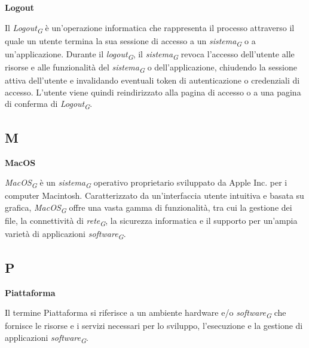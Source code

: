 \vspace{0.4cm}

\textbf{Logout}

\vspace{0.1cm}

Il \textit{Logout}\textsubscript{\textit{G}} è un'operazione informatica che rappresenta il processo attraverso il quale un utente termina la sua sessione di accesso a un \textit{sistema}\textsubscript{\textit{G}} o a un'applicazione. Durante il \textit{logout}\textsubscript{\textit{G}}, il \textit{sistema}\textsubscript{\textit{G}} revoca l'accesso dell'utente alle risorse e alle funzionalità del \textit{sistema}\textsubscript{\textit{G}} o dell'applicazione, chiudendo la sessione attiva dell'utente e invalidando eventuali token di autenticazione o credenziali di accesso. L'utente viene quindi reindirizzato alla pagina di accesso o a una pagina di conferma di \textit{Logout}\textsubscript{\textit{G}}.

\subsection{M}

\vspace{0.4cm}

\textbf{MacOS}

\vspace{0.1cm}

\textit{MacOS}\textsubscript{\textit{G}} è un \textit{sistema}\textsubscript{\textit{G}} operativo proprietario sviluppato da Apple Inc. per i computer Macintosh. Caratterizzato da un'interfaccia utente intuitiva e basata su grafica, \textit{MacOS}\textsubscript{\textit{G}} offre una vasta gamma di funzionalità, tra cui la gestione dei file, la connettività di \textit{rete}\textsubscript{\textit{G}}, la sicurezza informatica e il supporto per un'ampia varietà di applicazioni \textit{software}\textsubscript{\textit{G}}.

\subsection{P}

\vspace{0.4cm}

\textbf{Piattaforma}

\vspace{0.1cm}

Il termine Piattaforma si riferisce a un ambiente hardware e/o \textit{software}\textsubscript{\textit{G}} che fornisce le risorse e i servizi necessari per lo sviluppo, l'esecuzione e la gestione di applicazioni \textit{software}\textsubscript{\textit{G}}.


